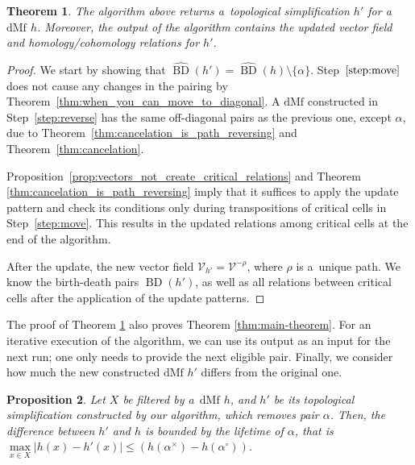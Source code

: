 \documentclass[a4paper,12pt, USenglish,cleveref,autoref,thm-restate]{article}
\newtheorem{theorem}{Theorem}
\newtheorem{proposition}[theorem]{Proposition}
\newcommand{\mf}{h}
\newcommand{\omf}{h'}
\DeclareMathOperator{\bd}{BD}
\newcommand{\upbd}{\hat{\bd}}
\newcommand{\dmf}{\text{dMf}}
\newcommand{\cx}{x}
\newcommand{\bth}[1]{#1^\circ}
\newcommand{\dth}[1]{#1^{\!\times}}
\newcommand{\bds}{\alpha}
\newcommand{\cV}{\mathcal{V}}
\begin{document}
\begin{theorem}\label{thm:algorithm_works}
    The algorithm above returns a~topological simplification $\omf$ for a~$\dmf$ $\mf$.
    Moreover, the output of the algorithm contains the updated vector field and homology/cohomology relations for $\omf$.
\end{theorem}

\begin{proof}
    We start by showing that $\upbd(\omf) = \upbd(\mf)\setminus\{\bds\}$. Step~$\ref{step:move}$ does not cause any changes in the pairing by Theorem~\ref{thm:when_you_can_move_to_diagonal}. A $\dmf$ constructed in Step~\ref{step:reverse} has the same off-diagonal pairs as the previous one, except $\bds$, due to Theorem~\ref{thm:cancelation_is_path_reversing} and Theorem~\ref{thm:cancelation}. 


    
\noindent Proposition~\ref{prop:vectors_not_create_critical_relations} and Theorem \ref{thm:cancelation_is_path_reversing} imply that it suffices to apply the update pattern and check its conditions only during transpositions of critical cells in Step~\ref{step:move}. This results in the updated relations among critical cells at the end of the algorithm.



\noindent After the update, the new vector field $\cV_{\omf} = \cV^{-\rho}$, where $\rho$ is a~unique path. We know the birth-death pairs $\bd(\omf)$, as well as all relations between critical cells after the application of the update patterns.
\end{proof}

\noindent The proof of Theorem \ref{thm:algorithm_works} also proves Theorem \ref{thm:main-theorem}. 
For an iterative execution of the algorithm, we can use its output as an input for the next run; one only needs to provide the next eligible pair.
Finally, we consider how much the new constructed $\dmf$ $\omf$ differs from the original one.

\begin{proposition}
    Let $X$ be filtered by a~$\dmf$ $\mf$, and $\omf$ be its topological simplification constructed by our algorithm, which removes pair $\bds$. Then, the difference between $\omf$ and $\mf$ is bounded by the lifetime of $\bds$, that is 
    $\max\limits_{x \in X} |\mf(\cx) - \omf(\cx)| \leq (\mf(\dth\bds) - \mf(\bth\bds))$.
\end{proposition}
\end{document}

